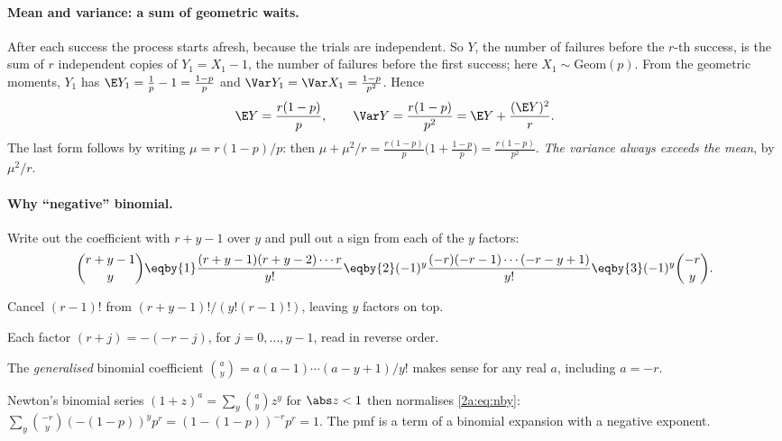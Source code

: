 \paragraph{Mean and variance: a sum of geometric waits.} After each success the process starts afresh, because the trials are independent. So $Y$, the number of failures before the $r$-th success, is the sum of $r$ independent copies of $Y_1=X_1-1$, the number of failures before the first success; here $X_1\sim\mathrm{Geom}(p)$. From the geometric moments, $Y_1$ has $\E Y_1=\frac1p-1=\frac{1-p}p$ and $\Var Y_1=\Var X_1=\frac{1-p}{p^2}$. Hence
\begin{equation}
  \E Y=\frac{r(1-p)}{p},\qquad \Var Y=\frac{r(1-p)}{p^2}=\E Y+\frac{(\E Y)^2}{r}. \label{2a:eq:nbvar}
\end{equation}
The last form follows by writing $\mu=r(1-p)/p$: then $\mu+\mu^2/r=\frac{r(1-p)}p\bigl(1+\frac{1-p}{p}\bigr)=\frac{r(1-p)}{p^2}$. \emph{The variance always exceeds the mean}, by $\mu^2/r$.

\paragraph{Why ``negative'' binomial.} Write out the coefficient with $r+y-1$ over $y$ and pull out a sign from each of the $y$ factors:
\begin{align*}
  \binom{r+y-1}{y} \eqby{1} \frac{(r+y-1)(r+y-2)\cdots r}{y!}
  \eqby{2} (-1)^y\frac{(-r)(-r-1)\cdots(-r-y+1)}{y!}
  \eqby{3} (-1)^y\binom{-r}{y}.
\end{align*}
\begin{explain}
  \item Cancel $(r-1)!$ from $(r+y-1)!/(y!(r-1)!)$, leaving $y$ factors on top.
  \item Each factor $(r+j)=-(-r-j)$, for $j=0,\dots,y-1$, read in reverse order.
  \item The \emph{generalised} binomial coefficient $\binom{a}{y}=a(a-1)\cdots(a-y+1)/y!$ makes sense for any real $a$, including $a=-r$.
\end{explain}
Newton's binomial series $(1+z)^a=\sum_y\binom ay z^y$ for $\abs z<1$ then normalises \eqref{2a:eq:nby}: $\sum_y\binom{-r}{y}(-(1-p))^yp^r=(1-(1-p))^{-r}p^r=1$. The pmf is a term of a binomial expansion with a negative exponent.

